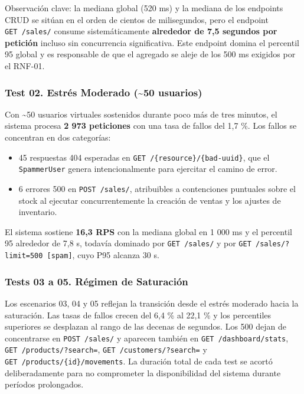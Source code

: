 Observación clave: la mediana global (520 ms) y la mediana de los endpoints CRUD se sitúan en el orden de cientos de milisegundos, pero el endpoint \texttt{GET\ /sales/} consume sistemáticamente \textbf{alrededor de 7,5 segundos por petición} incluso sin concurrencia significativa. Este endpoint domina el percentil 95 global y es responsable de que el agregado se aleje de los 500 ms exigidos por el RNF-01.

\subsubsection{Test 02. Estrés Moderado (\textasciitilde50 usuarios)}\label{test-02.-estruxe9s-moderado-50-usuarios}

Con \textasciitilde50 usuarios virtuales sostenidos durante poco más de tres minutos, el sistema procesa \textbf{2 973 peticiones} con una tasa de fallos del 1,7 \%. Los fallos se concentran en dos categorías:

\begin{itemize}
\tightlist
\item
  45 respuestas 404 esperadas en \texttt{GET\ /\{resource\}/\{bad-uuid\}}, que el \texttt{SpammerUser} genera intencionalmente para ejercitar el camino de error.
\item
  6 errores 500 en \texttt{POST\ /sales/}, atribuibles a contenciones puntuales sobre el stock al ejecutar concurrentemente la creación de ventas y los ajustes de inventario.
\end{itemize}

El sistema sostiene \textbf{16,3 RPS} con la mediana global en 1 000 ms y el percentil 95 alrededor de 7,8 s, todavía dominado por \texttt{GET\ /sales/} y por \texttt{GET\ /sales/?limit=500\ {[}spam{]}}, cuyo P95 alcanza 30 s.

\subsubsection{Tests 03 a 05. Régimen de Saturación}\label{tests-03-a-05.-ruxe9gimen-de-saturaciuxf3n}

Los escenarios 03, 04 y 05 reflejan la transición desde el estrés moderado hacia la saturación. Las tasas de fallos crecen del 6,4 \% al 22,1 \% y los percentiles superiores se desplazan al rango de las decenas de segundos. Los 500 dejan de concentrarse en \texttt{POST\ /sales/} y aparecen también en \texttt{GET\ /dashboard/stats}, \texttt{GET\ /products/?search=}, \texttt{GET\ /customers/?search=} y \texttt{GET\ /products/\{id\}/movements}. La duración total de cada test se acortó deliberadamente para no comprometer la disponibilidad del sistema durante períodos prolongados.

